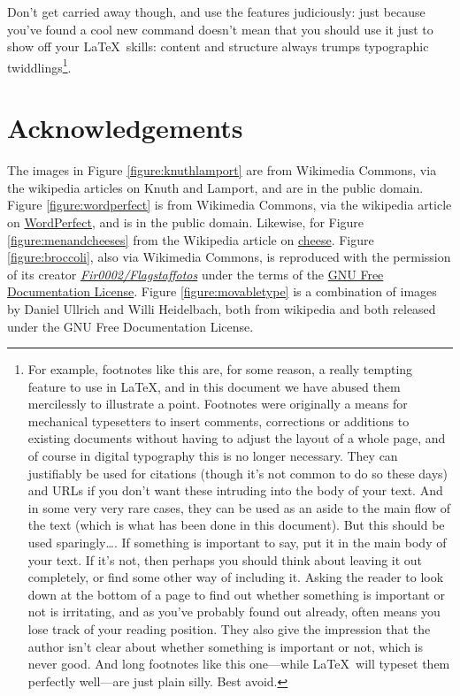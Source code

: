 \begin{refsection}
Don't get carried away though, and use the features judiciously: just because you've found a cool new command doesn't mean that you should use it just to show off your \LaTeX\ skills: content and structure always trumps typographic twiddlings\footnote{For example, footnotes like this are, for some reason, a really tempting feature to use in \LaTeX, and in this document we have abused them mercilessly to illustrate a point. Footnotes were originally a means for mechanical typesetters to insert comments, corrections or additions to existing documents without having to adjust the layout of a whole page, and of course in digital typography this is no longer necessary. They can justifiably be used for citations (though it's not common to do so these days) and URLs if you don't want these intruding into the body of your text. And in some very very rare cases, they can be used as an aside to the main flow of the text (which is what has been done in this document). But this should be used sparingly\ldots. If something is important to say, put it in the main body of your text. If it's not, then perhaps you should think about leaving it out completely, or find some other way of including it. Asking the reader to look down at the bottom of a page to find out whether something is important or not is irritating, and as you've probably found out already, often means you lose track of your reading position. They also give the impression that the author isn't clear about whether something is important or not, which is never good. And long footnotes like this one---while \LaTeX\ will typeset them perfectly well---are just plain silly. Best avoid.}.

\section{Acknowledgements}

 The images in Figure \ref{figure:knuthlamport} are from Wikimedia Commons, via the wikipedia articles on Knuth and Lamport, and are in the public domain. Figure \ref{figure:wordperfect} is from Wikimedia Commons, via the wikipedia article on \href{http://en.wikipedia.org/wiki/WordPerfect}{WordPerfect}, and is in the public domain. Likewise, for Figure \ref{figure:menandcheeses} from the Wikipedia article on \href{http://en.wikipedia.org/wiki/Cheese}{cheese}. Figure \ref{figure:broccoli}, also via Wikimedia Commons, is reproduced with the permission of its creator \href{http://commons.wikimedia.org/wiki/User:Fir0002}{\emph{Fir0002/Flagstaffotos}} under the terms of the \href{http://commons.wikimedia.org/wiki/Commons:GNU_Free_Documentation_License_1.2}{GNU Free Documentation License}. Figure \ref{figure:movabletype} is a combination of images by Daniel Ullrich and Willi Heidelbach, both from wikipedia and both released under the GNU Free Documentation License.

\printbibliography[heading=subbibliography]
\end{refsection}

